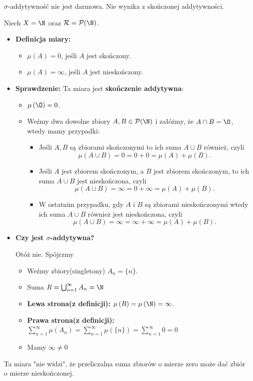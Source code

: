 	$\sigma$-addytywność nie jest darmowa. Nie wynika z skończonej addytywności.
	\begin{eg}
		 Niech $X = \N$ oraz $\mathcal{R} = \mathcal{P}(\N) $.
	\begin{itemize}
		\item \textbf{Definicja miary:} 
			\begin{itemize}
				\item $\mu\left( A \right) = 0$, jeśli $A$ jest skończony.
				\item $\mu\left( A \right) = \infty$, jeśli $A$ jest nieskończony.
			\end{itemize}
		\item \textbf{Sprawdzenie:} Ta miara jest \textbf{skończenie addytywna}:
			\begin{itemize}
				\item $\mu\left( \O \right) = 0$.
				\item Weźmy dwa dowolne zbiory $A, B \in \mathcal{P}(\N) $ i załóżmy, że $A\cap B = \O$, wtedy mamy przypadki:
					\begin{itemize}
						\item Jeśli $A,B$ są zbiorami skończonymi to ich suma $A\cup B$ również, czyli
							 \[
							\mu\left( A\cup B \right) = 0 = 0 + 0 = \mu\left( A \right) + \mu\left( B \right) 
							.\] 
						\item Jeśli $A$ jest zbiorem skończonym, a $B$ jest zbiorem skończonym, to ich suma $A\cup B$ jest nieskończona, czyli
					 		\[
							\mu\left( A\cup B \right) = \infty = 0 + \infty = \mu\left( A \right) + \mu\left( B \right) 							   .\]
						\item W ostatnim przypadku, gdy $A$ i $B$ są zbiorami nieskończonymi wtedy ich suma $A\cup B$ również jest nieskończona, czyli
							\[
							\mu\left( A\cup B \right) = \infty = \infty + \infty = \mu\left( A \right) + \mu\left( B \right) 
							.\] 
					\end{itemize}
			\end{itemize}
		\item \textbf{Czy jest $\sigma$-addytywna?}

			Otóż nie. Spójrzmy
			\begin{itemize}
				\item Weźmy zbiory(singletony) $A_{n} = \{n\} $.
				\item Suma $R = \bigcup_{n=1} ^{\infty}A_{n} = \N$
				\item \textbf{Lewa strona(z definicji):} $\mu\left( R \right) = \mu\left( \N \right) = \infty$.
				\item \textbf{Prawa strona(z definicji):} $\sum_{n=1}^{\infty} \mu\left( A_{n} \right) = \sum_{n=1}^{\infty} \mu\left( \{n\}  \right) = \sum_{n=1}^{\infty} 0= 0$ 
				\item Mamy $\infty \neq  0$
			\end{itemize}
	\end{itemize}
	Ta miara "nie widzi", że przeliczalna suma zbiorów o mierze zero może dać zbiór o mierze nieskończonej.
	\end{eg} 

